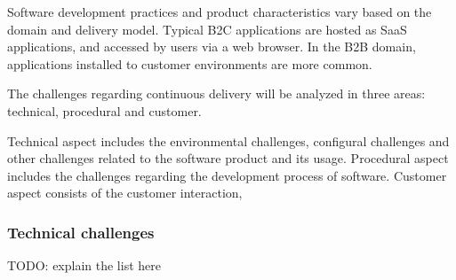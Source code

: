 \documentclass[english]{tktltiki2}
\theoremstyle{definition}
\theoremstyle{remark}
\begin{document}



Software development practices and product characteristics vary based on the domain and delivery model. Typical B2C applications are hosted as SaaS applications, and accessed by users via a web browser. In the B2B domain, applications installed to customer environments are more common. 

The challenges regarding continuous delivery will be analyzed in three areas: technical, procedural and customer. 

Technical aspect includes the environmental challenges, configural challenges and other challenges related to the software product and its usage. Procedural aspect includes the challenges regarding the development process of software. Customer aspect consists of the customer interaction, 

\subsubsection{Technical challenges}

TODO: explain the list here
\end{document}
